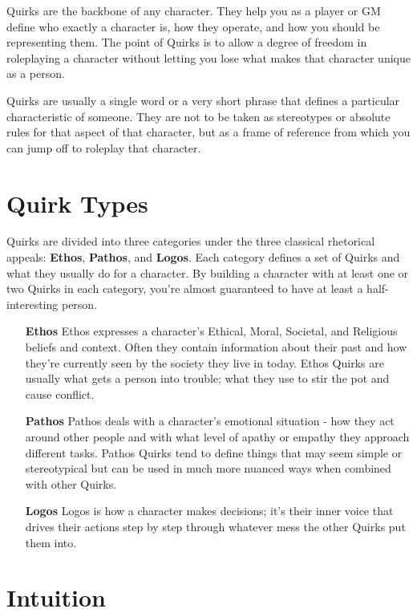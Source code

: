 \documentclass[../main.tex]{subfiles}
\begin{document}
    Quirks are the backbone of any character. They help you as a player or GM define who exactly a character is, how they operate, and how you should be representing them. The point of Quirks is to allow a degree of freedom in roleplaying a character without letting you lose what makes that character unique as a person.

    Quirks are usually a single word or a very short phrase that defines a particular characteristic of someone. They are not to be taken as stereotypes or absolute rules for that aspect of that character, but as a frame of reference from which you can jump off to roleplay that character. 
      
    \section{Quirk Types}

    Quirks are divided into three categories under the three classical rhetorical appeals: \textbf{Ethos}, \textbf{Pathos}, and \textbf{Logos}. Each category defines a set of Quirks and what they usually do for a character. By building a character with at least one or two Quirks in each category, you're almost guaranteed to have at least a half-interesting person.

    \begin{itemize}
        \item [\textbf{Ethos}] Ethos expresses a character's Ethical, Moral, Societal, and Religious beliefs and context. Often they contain information about their past and how they're currently seen by the society they live in today. Ethos Quirks are usually what gets a person into trouble; what they use to stir the pot and cause conflict.
        
        \item [\textbf{Pathos}] Pathos deals with a character's emotional situation - how they act around other people and with what level of apathy or empathy they approach different tasks. Pathos Quirks tend to define things that may seem simple or stereotypical but can be used in much more nuanced ways when combined with other Quirks.
        
        \item [\textbf{Logos}] Logos is how a character makes decisions; it's their inner voice that drives their actions step by step through whatever mess the other Quirks put them into.
    \end{itemize}

    \section{Intuition}\label{intuition}
\end{document}
